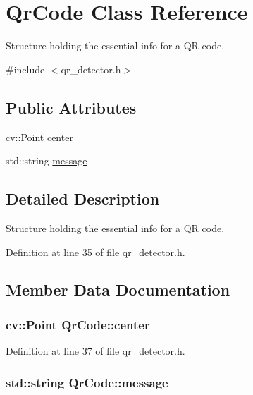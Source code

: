 \hypertarget{structQrCode}{\section{Qr\-Code Class Reference}
\label{structQrCode}
}


Structure holding the essential info for a Q\-R code.  




{\ttfamily \#include $<$qr\-\_\-detector.\-h$>$}

\subsection*{Public Attributes}
\begin{DoxyCompactItemize}
\item 
cv\-::\-Point \hyperlink{structQrCode_ad2fbd1b518821ca18226ee718f06c8f2}{center}
\item 
std\-::string \hyperlink{structQrCode_a50c2833944aaacd05c0612fa038974c6}{message}
\end{DoxyCompactItemize}


\subsection{Detailed Description}
Structure holding the essential info for a Q\-R code. 

Definition at line 35 of file qr\-\_\-detector.\-h.



\subsection{Member Data Documentation}
\hypertarget{structQrCode_ad2fbd1b518821ca18226ee718f06c8f2}{
\subsubsection[{center}]{\setlength{\rightskip}{0pt plus 5cm}cv\-::\-Point Qr\-Code\-::center}}\label{structQrCode_ad2fbd1b518821ca18226ee718f06c8f2}


Definition at line 37 of file qr\-\_\-detector.\-h.

\hypertarget{structQrCode_a50c2833944aaacd05c0612fa038974c6}{
\subsubsection[{message}]{\setlength{\rightskip}{0pt plus 5cm}std\-::string Qr\-Code\-::message}}\label{structQrCode_a50c2833944aaacd05c0612fa038974c6}


